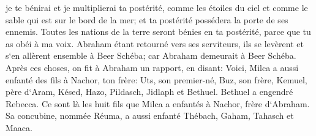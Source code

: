 \verse je te bénirai et je multiplierai ta postérité, comme les étoiles du ciel et comme le sable qui est sur le bord de la mer; et ta postérité possédera la porte de ses ennemis. 
\verse Toutes les nations de la terre seront bénies en ta postérité, parce que tu as obéi à ma voix. 
\verse Abraham étant retourné vers ses serviteurs, ils se levèrent et s`en allèrent ensemble à Beer Schéba; car Abraham demeurait à Beer Schéba. 
\verse Après ces choses, on fit à Abraham un rapport, en disant: Voici, Milca a aussi enfanté des fils à Nachor, ton frère: 
\verse Uts, son premier-né, Buz, son frère, Kemuel, père d`Aram, 
\verse Késed, Hazo, Pildasch, Jidlaph et Bethuel. 
\verse Bethuel a engendré Rebecca. Ce sont là les huit fils que Milca a enfantés à Nachor, frère d`Abraham. 
\verse Sa concubine, nommée Réuma, a aussi enfanté Thébach, Gaham, Tahasch et Maaca. 

\chapter{}

